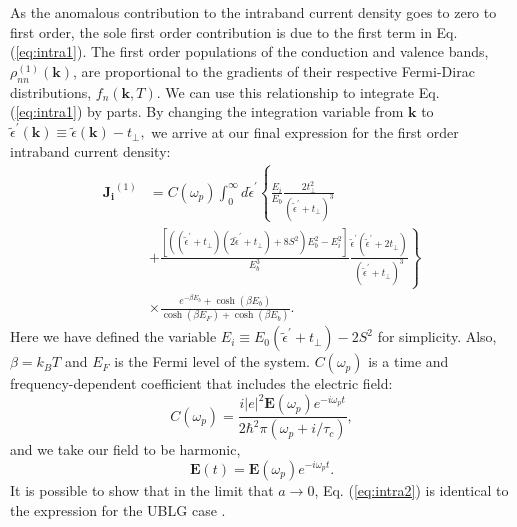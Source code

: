 \documentclass[twocolumn,secnumarabic,amssymb, nobibnotes, aps, prd, superscriptaddress]{revtex4-1}
\begin{document}
As the anomalous contribution to the intraband current density goes to zero to first order, the sole first order contribution is due to the first term in Eq. (\ref{eq:intra1}). The first order populations of the conduction and valence bands, $\rho_{nn}^{(1)}(\mathbf{k})$, are proportional to the gradients of their respective Fermi-Dirac distributions, $f_{n}(\mathbf{k},T)$. We can use this relationship to integrate Eq. (\ref{eq:intra1}) by parts.  By changing the integration variable from $\mathbf{k}$ to $\tilde{\epsilon}^{\prime}(\mathbf{k})\equiv\tilde{\epsilon}(\mathbf{k})-t_{\perp},$ we arrive at our final expression for the first order intraband current density:
\begin{equation}
\begin{aligned}\mathbf{J_{i}}^{(1)} & =C(\omega_{p})\int_{0}^{\infty}d\tilde{\epsilon}^{\prime}\left\{ \frac{E_{i}}{E_{b}}\frac{2t_{\perp}^{2}}{(\tilde{\epsilon}^{\prime}+t_{\perp})^{3}}\right.\\
 & +\left.\frac{\left[\left((\tilde{\epsilon}^{\prime}+t_{\perp})(2\tilde{\epsilon}^{\prime}+t_{\perp})+8S^{2}\right)E_{b}^{2}-E_{i}^{2}\right]}{E_{b}^{3}}\frac{\tilde{\epsilon}^{\prime}(\tilde{\epsilon}^{\prime}+2t_{\perp})}{(\tilde{\epsilon}^{\prime}+t_{\perp})^{3}}\right\} \\
 & \times\frac{e^{-\beta E_{b}}+\cosh(\beta E_{b})}{\cosh(\beta E_{F})+\cosh(\beta E_{b})}.
\end{aligned}\label{eq:intra2}
\end{equation}
Here we have defined the variable $E_{i}\equiv E_{0}(\tilde{\epsilon}^{\prime}+t_{\perp})-2S^{2}$ for simplicity. Also, $\beta=k_{B}T$ and $E_{F}$ is the Fermi level of the system. $C(\omega_{p})$ is a time and frequency-dependent coefficient that includes the electric field: $$C(\omega_{p})=\frac{i|e|^{2}\mathbf{E}\left(\omega_{p}\right)e^{-i\omega_{p}t}}{2\hbar^{2}\pi\left(\omega_{p}+i/\tau_{c}\right)},$$ and we take our field to be harmonic, $$\mathbf{E}\left(t\right)=\mathbf{E}\left(\omega_{p}\right)e^{-i\omega_{p}t}.$$  It is possible to show that in the limit that $a\rightarrow0$, Eq. (\ref{eq:intra2}) is identical to the expression for the UBLG case \cite{mcgouran2016nonlinear}.
\end{document}
